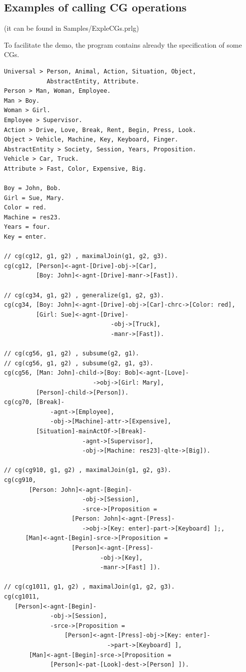 \documentclass{book}
\begin{document}
\subsection{Examples of calling CG operations}

(it can be found in Samples/ExpleCGs.prlg)

To facilitate the demo, the program contains already the specification
of some CGs.


\begin{verbatim}
Universal > Person, Animal, Action, Situation, Object, 
            AbstractEntity, Attribute.
Person > Man, Woman, Employee.
Man > Boy.
Woman > Girl.
Employee > Supervisor.
Action > Drive, Love, Break, Rent, Begin, Press, Look.
Object > Vehicle, Machine, Key, Keyboard, Finger.
AbstractEntity > Society, Session, Years, Proposition.
Vehicle > Car, Truck.
Attribute > Fast, Color, Expensive, Big.

Boy = John, Bob.
Girl = Sue, Mary.
Color = red.
Machine = res23.
Years = four.
Key = enter.

// cg(cg12, g1, g2) , maximalJoin(g1, g2, g3).
cg(cg12, [Person]<-agnt-[Drive]-obj->[Car],
         [Boy: John]<-agnt-[Drive]-manr->[Fast]).

// cg(cg34, g1, g2) , generalize(g1, g2, g3).
cg(cg34, [Boy: John]<-agnt-[Drive]-obj->[Car]-chrc->[Color: red],
         [Girl: Sue]<-agnt-[Drive]-
                              -obj->[Truck],
                              -manr->[Fast]).

// cg(cg56, g1, g2) , subsume(g2, g1).
// cg(cg56, g1, g2) , subsume(g2, g1, g3).
cg(cg56, [Man: John]-child->[Boy: Bob]<-agnt-[Love]-
                         ->obj->[Girl: Mary],
         [Person]-child->[Person]).
cg(cg70, [Break]-
             -agnt->[Employee],
             -obj->[Machine]-attr->[Expensive],
         [Situation]-mainActOf->[Break]-
                      -agnt->[Supervisor],
                      -obj->[Machine: res23]-qlte->[Big]).

// cg(cg910, g1, g2) , maximalJoin(g1, g2, g3).
cg(cg910,
       [Person: John]<-agnt-[Begin]-
                      -obj->[Session],
                      -srce->[Proposition = 
                   [Person: John]<-agnt-[Press]-
                      ->obj->[Key: enter]-part->[Keyboard] ];,
      [Man]<-agnt-[Begin]-srce->[Proposition = 
                   [Person]<-agnt-[Press]-
                           -obj->[Key],
                           -manr->[Fast] ]).

// cg(cg1011, g1, g2) , maximalJoin(g1, g2, g3).
cg(cg1011,
   [Person]<-agnt-[Begin]-
             -obj->[Session],
             -srce->[Proposition =
                 [Person]<-agnt-[Press]-obj->[Key: enter]-
                             ->part->[Keyboard] ],
       [Man]<-agnt-[Begin]-srce->[Proposition = 
             [Person]<-pat-[Look]-dest->[Person] ]).
\end{verbatim}
\end{document}
